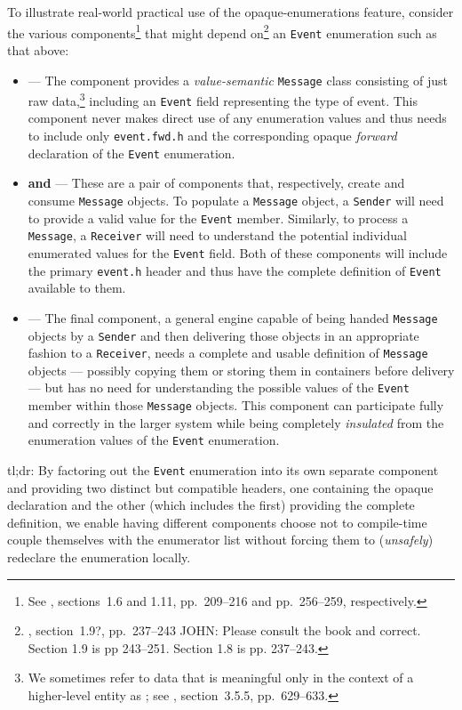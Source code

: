   To illustrate real-world practical use of the opaque-enumerations
feature, consider the various components{\cprotect\footnote{See
  \cite{lakos20}, sections~1.6 and 1.11, pp.~209--216 and
  pp.~256--259, respectively.}} that might depend
on{\cprotect\footnote{\cite{lakos20}, section~1.9?, pp.~237--243  JOHN: Please consult the book and correct. Section 1.9 is pp 243--251. Section 1.8 is pp. 237--243.}} an \lstinline!Event! enumeration such as that above:
\begin{itemize}
\item{\textbf{} — The component provides a \emph{value-semantic} \lstinline!Message! class consisting of just raw data,\cprotect\footnote{We sometimes refer to data that is meaningful only in the context of a higher-level entity as ; see \cite{lakos20}, section~3.5.5, pp.~629--633.} including an \lstinline!Event! field representing the type of event. This component never makes direct use of any enumeration values and thus needs to include only \lstinline!event.fwd.h! and the corresponding opaque \emph{forward} declaration of the \lstinline!Event! enumeration.}
\item{\textbf{ and } — These are a pair of components that, respectively, create and consume \lstinline!Message! objects. To populate a \lstinline!Message! object, a \lstinline!Sender! will need to provide a valid value for the \lstinline!Event! member. Similarly, to process a \lstinline!Message!, a \lstinline!Receiver! will need to understand the potential individual enumerated values for the \lstinline!Event! field. Both of these components will include the primary \lstinline!event.h! header and thus have the complete definition of \lstinline!Event! available to them.}
\item{\textbf{} — The final component, a general engine capable of being handed \lstinline!Message! objects by a \lstinline!Sender! and then delivering those objects in an appropriate fashion to a \lstinline!Receiver!, needs a complete and usable definition of \lstinline!Message! objects — possibly copying them or storing them in containers before delivery — but has no need for understanding the possible values of the \lstinline!Event! member within those \lstinline!Message! objects. This component can participate fully and correctly in the larger system while being completely \emph{insulated} from the enumeration values of the \lstinline!Event! enumeration.}
\end{itemize}
tl;dr: By factoring out the \lstinline!Event! enumeration into its own
separate component and providing two distinct but compatible headers,
one containing the opaque declaration and the other (which includes the
first) providing the complete definition, we enable having different
components choose not to compile-time couple themselves with the
enumerator list without forcing them to (\emph{unsafely}) redeclare the
enumeration locally.

